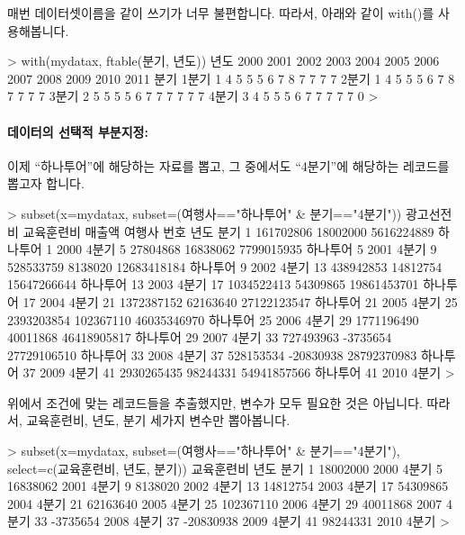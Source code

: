 매번 데이터셋이름을 같이 쓰기가 너무 불편합니다.
따라서, 아래와 같이 with()를 사용해봅니다.

\begin{Schunk}
\begin{Soutput}
> with(mydatax, ftable(분기, 년도))
      년도 2000 2001 2002 2003 2004 2005 2006 2007 2008 2009 2010 2011
분기                                                                  
1분기         1    4    5    5    5    6    7    8    7    7    7    7
2분기         1    4    5    5    5    6    7    8    7    7    7    7
3분기         2    5    5    5    5    6    7    7    7    7    7    7
4분기         3    4    5    5    5    6    7    7    7    7    7    0
> 
\end{Soutput}
\end{Schunk}


\paragraph{데이터의 선택적 부분지정:}
이제 ``하나투어''에 해당하는 자료를 뽑고, 그 중에서도 ``4분기''에 해당하는 레코드를 뽑고자 합니다.

\begin{Schunk}
\begin{Soutput}
> subset(x=mydatax, subset=(여행사=="하나투어" & 분기=="4분기"))
   광고선전비 교육훈련비      매출액   여행사 번호 년도  분기
1   161702806   18002000  5616224889 하나투어    1 2000 4분기
5    27804868   16838062  7799015935 하나투어    5 2001 4분기
9   528533759    8138020 12683418184 하나투어    9 2002 4분기
13  438942853   14812754 15647266644 하나투어   13 2003 4분기
17 1034522413   54309865 19861453701 하나투어   17 2004 4분기
21 1372387152   62163640 27122123547 하나투어   21 2005 4분기
25 2393203854  102367110 46035346970 하나투어   25 2006 4분기
29 1771196490   40011868 46418905817 하나투어   29 2007 4분기
33  727493963   -3735654 27729106510 하나투어   33 2008 4분기
37  528153534  -20830938 28792370983 하나투어   37 2009 4분기
41 2930265435   98244331 54941857566 하나투어   41 2010 4분기
> 
\end{Soutput}
\end{Schunk}


위에서 조건에 맞는 레코드들을 추출했지만, 변수가 모두 필요한 것은 아닙니다.
따라서, 교육훈련비, 년도, 분기 세가지 변수만 뽑아봅니다.

\begin{Schunk}
\begin{Soutput}
> subset(x=mydatax, subset=(여행사=="하나투어" & 분기=="4분기"), select=c(교육훈련비, 년도, 분기))
   교육훈련비 년도  분기
1    18002000 2000 4분기
5    16838062 2001 4분기
9     8138020 2002 4분기
13   14812754 2003 4분기
17   54309865 2004 4분기
21   62163640 2005 4분기
25  102367110 2006 4분기
29   40011868 2007 4분기
33   -3735654 2008 4분기
37  -20830938 2009 4분기
41   98244331 2010 4분기
> 
\end{Soutput}
\end{Schunk}

